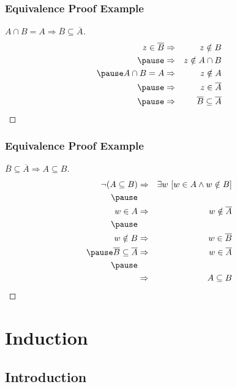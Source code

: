\documentclass[dvipsnames]{beamer}
\begin{document}
\begin{frame}
  \frametitle{Equivalence Proof Example}

  \begin{proof}[$A \cap B = A \Rightarrow \overline{B} \subseteq \overline{A}$]
    \begin{eqnarray*}
      z \in \overline{B} & \Rightarrow & z \notin B\\\pause
                         & \Rightarrow & z \notin A \cap B\\\pause
      A \cap B = A       & \Rightarrow & z \notin A\\\pause
                         & \Rightarrow & z \in \overline{A}\\\pause
                         & \Rightarrow & \overline{B} \subseteq \overline{A}
    \end{eqnarray*}
  \end{proof}
\end{frame}

\begin{frame}
  \frametitle{Equivalence Proof Example}

  \begin{proof}[$\overline{B} \subseteq \overline{A} \Rightarrow A \subseteq B$]
    \begin{eqnarray*}
      \neg (A \subseteq B) & \Rightarrow & \exists w~[w \in A \wedge w \notin B]\\\pause
                 &             &                      \\
      w \in A    & \Rightarrow & w \notin \overline{A}\\\pause
                 &             &                      \\
      w \notin B & \Rightarrow & w \in \overline{B}\\\pause
      \overline{B} \subseteq \overline{A}  & \Rightarrow & w \in \overline{A}\\\pause
                 &             &                      \\
                 & \Rightarrow & A \subseteq B
    \end{eqnarray*}
  \end{proof}
\end{frame}

\section{Induction}

\subsection{Introduction}
\end{document}
